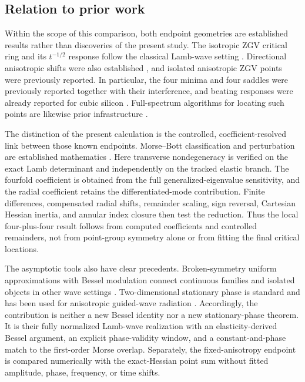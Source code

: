 \subsection{Relation to prior work}

Within the scope of this comparison, both endpoint geometries are established
results rather than discoveries of the present study.  The isotropic ZGV
critical ring and its \(t^{-1/2}\) response follow the classical Lamb-wave
setting \citep{lamb1917waves,prada2008local,prada2008power}.  Directional
anisotropic shifts were also established \citep{prada2009anisotropy}, and
isolated anisotropic ZGV points were previously reported.  In particular, the
four minima and four saddles were previously reported together with their
interference, and beating responses were already reported for cubic silicon
\citep{kiefer2023beating,kiefer2025skewing}.  Full-spectrum algorithms for
locating such points are likewise prior infrastructure
\citep{kiefer2023computing}.

The distinction of the present calculation is the controlled,
coefficient-resolved link between those known endpoints.  Morse--Bott
classification and perturbation are established mathematics
\citep{bott1954critical,banyaga2013cascades}.  Here transverse nondegeneracy is
verified on the exact Lamb determinant and independently on the tracked
elastic branch.  The fourfold coefficient is obtained from the full
generalized-eigenvalue sensitivity, and the radial coefficient retains the
differentiated-mode contribution.  Finite differences, compensated radial
shifts, remainder scaling, sign reversal, Cartesian Hessian inertia, and
annular index closure then test the reduction.  Thus the local four-plus-four
result follows from computed coefficients and controlled remainders, not from
point-group symmetry alone or from fitting the final critical locations.

The asymptotic tools also have clear precedents.  Broken-symmetry uniform
approximations with Bessel modulation connect continuous families and isolated
objects in other wave settings \citep{creagh1996broken,brack1999uniform,
brack2009closed}.  Two-dimensional stationary phase is standard and has been
used for anisotropic guided-wave radiation
\citep{velichko2007excitation,chapuis2010focusing,karmazin2013caustics}.
Accordingly, the contribution is neither a new Bessel identity nor a new
stationary-phase theorem.  It is their fully normalized Lamb-wave realization
with an elasticity-derived Bessel argument, an explicit phase-validity window,
and a constant-and-phase match to the first-order Morse overlap.  Separately,
the fixed-anisotropy endpoint is compared numerically with the exact-Hessian
point sum without fitted amplitude, phase, frequency, or time shifts.


